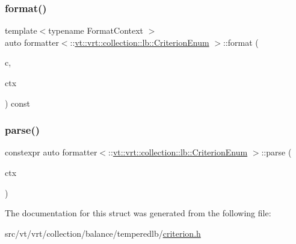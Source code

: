 \subsubsection{\texorpdfstring{format()}{format()}}
{\footnotesize\ttfamily template$<$typename Format\+Context $>$ \\
auto formatter$<$\+::\hyperlink{namespacevt_1_1vrt_1_1collection_1_1lb_a4e454750e102cf5404d5ac151148951c}{vt\+::vrt\+::collection\+::lb\+::\+Criterion\+Enum} $>$\+::format (\begin{DoxyParamCaption}\item[{\+::\hyperlink{namespacevt_1_1vrt_1_1collection_1_1lb_a4e454750e102cf5404d5ac151148951c}{vt\+::vrt\+::collection\+::lb\+::\+Criterion\+Enum}}]{c,  }\item[{Format\+Context \&}]{ctx }\end{DoxyParamCaption}) const\hspace{0.3cm}{\ttfamily [inline]}}

\mbox{\label{structformatter_3_1_1vt_1_1vrt_1_1collection_1_1lb_1_1_criterion_enum_01_4_a694d4616d8acf9d6d36bf094316ca647}} 
\subsubsection{\texorpdfstring{parse()}{parse()}}
{\footnotesize\ttfamily constexpr auto formatter$<$\+::\hyperlink{namespacevt_1_1vrt_1_1collection_1_1lb_a4e454750e102cf5404d5ac151148951c}{vt\+::vrt\+::collection\+::lb\+::\+Criterion\+Enum} $>$\+::parse (\begin{DoxyParamCaption}\item[{fmt\+::format\+\_\+parse\+\_\+context \&}]{ctx }\end{DoxyParamCaption})\hspace{0.3cm}{\ttfamily [inline]}}



The documentation for this struct was generated from the following file\+:\begin{DoxyCompactItemize}
\item 
src/vt/vrt/collection/balance/temperedlb/\hyperlink{criterion_8h}{criterion.\+h}\end{DoxyCompactItemize}
